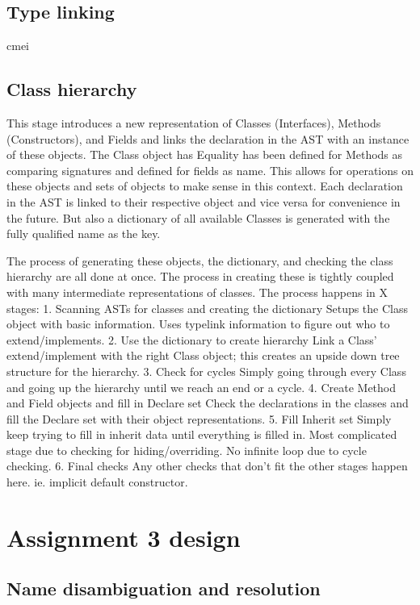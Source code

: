 \documentclass[12pt]{article}
\begin{document}
\subsection{Type linking}
cmei

\subsection{Class hierarchy}
This stage introduces a new representation of Classes (Interfaces),
Methods (Constructors), and Fields and links the declaration in the AST
with an instance of these objects. The Class object has 
Equality has been defined for Methods as
comparing signatures and defined for fields as name. This allows for operations
on these objects and sets of objects to make sense in this context.
Each declaration in the AST is linked to their respective object and vice versa
for convenience in the future. But also a dictionary of all available Classes
is generated with the fully qualified name as the key.

The process of generating these objects, the dictionary, and checking the
class hierarchy are all done at once. The process in creating these is tightly
coupled with many intermediate representations of classes.
The process happens in X stages:
1. Scanning ASTs for classes and creating the dictionary
    Setups the Class object with basic information.
    Uses typelink information to figure out who to extend/implements.
2. Use the dictionary to create hierarchy
    Link a Class' extend/implement with the right Class object; this creates
    an upside down tree structure for the hierarchy.
3. Check for cycles
    Simply going through every Class and going up the hierarchy
    until we reach an end or a cycle.
4. Create Method and Field objects and fill in Declare set
    Check the declarations in the classes and fill the Declare set
    with their object representations.
5. Fill Inherit set
    Simply keep trying to fill in inherit data until everything is filled in.
    Most complicated stage due to checking for hiding/overriding.
    No infinite loop due to cycle checking.
6. Final checks
    Any other checks that don't fit the other stages happen here.
    ie. implicit default constructor.

\section{Assignment 3 design}

\subsection{Name disambiguation and resolution}
\end{document}
